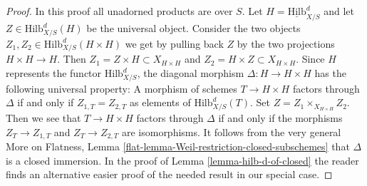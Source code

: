 \documentclass[10pt,a4paper]{amsart}
\theoremstyle{plain}
\theoremstyle{definition}
\theoremstyle{remark}
\numberwithin{equation}{subsection}
\def\Hilbfunctor{\mathrm{Hilb}}
\begin{document}
\begin{proof}
In this proof all unadorned products are over $S$.
Let $H = \underline{\Hilbfunctor}^d_{X/S}$ and let
$Z \in \Hilbfunctor^d_{X/S}(H)$ be the universal object.
Consider the two objects $Z_1, Z_2 \in \Hilbfunctor^d_{X/S}(H \times H)$
we get by pulling back $Z$ by the two projections $H \times H \to H$.
Then $Z_1 = Z \times H \subset X_{H \times H}$ and $Z_2 = H \times Z
\subset X_{H \times H}$. Since $H$ represents the functor
$\Hilbfunctor^d_{X/S}$, the diagonal morphism $\Delta : H \to H \times H$
has the following universal property: A morphism of schemes
$T \to H \times H$ factors through $\Delta$ if and only if
$Z_{1, T} = Z_{2, T}$ as elements of $\Hilbfunctor^d_{X/S}(T)$.
Set $Z = Z_1 \times_{X_{H \times H}} Z_2$. Then we see that
$T \to H \times H$ factors through $\Delta$ if and only if
the morphisms $Z_T \to Z_{1, T}$ and $Z_T \to Z_{2, T}$ are
isomorphisms. It follows from the very general
More on Flatness, Lemma \ref{flat-lemma-Weil-restriction-closed-subschemes}
that $\Delta$ is a closed immersion. In the proof of
Lemma \ref{lemma-hilb-d-of-closed}
the reader finds an alternative easier proof of the needed result
in our special case.
\end{proof}
\end{document}
